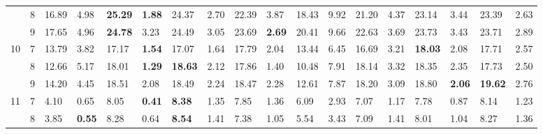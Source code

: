 \documentclass[conference]{IEEEtran}
\begin{document}
\begin{table*}[]
\begin{tabular}{|cl|ll|ll|ll|ll|ll|ll|ll|ll|}
		\multicolumn{1}{|c|}{} & 8 & \multicolumn{1}{l|}{16.89} & 4.98 & \multicolumn{1}{l|}{\textbf{25.29}} & \textbf{1.88} & \multicolumn{1}{l|}{24.37} & 2.70 & \multicolumn{1}{l|}{22.39} & 3.87 & \multicolumn{1}{l|}{18.43} & 9.92 & \multicolumn{1}{l|}{21.20} & 4.37 & \multicolumn{1}{l|}{23.14} & 3.44 & \multicolumn{1}{l|}{23.39} & 2.63 \\ \cline{2-18} 
		\multicolumn{1}{|c|}{} & 9 & \multicolumn{1}{l|}{17.65} & 4.96 & \multicolumn{1}{l|}{\textbf{24.78}} & 3.23 & \multicolumn{1}{l|}{24.49} & 3.05 & \multicolumn{1}{l|}{23.69} & \textbf{2.69} & \multicolumn{1}{l|}{20.41} & 9.66 & \multicolumn{1}{l|}{22.63} & 3.69 & \multicolumn{1}{l|}{23.73} & 3.43 & \multicolumn{1}{l|}{23.71} & 2.89 \\ \hline
		\multicolumn{1}{|c|}{\multirow{3}{*}{10}} & 7 & \multicolumn{1}{l|}{13.79} & 3.82 & \multicolumn{1}{l|}{17.17} & \textbf{1.54} & \multicolumn{1}{l|}{17.07} & 1.64 & \multicolumn{1}{l|}{17.79} & 2.04 & \multicolumn{1}{l|}{13.44} & 6.45 & \multicolumn{1}{l|}{16.69} & 3.21 & \multicolumn{1}{l|}{\textbf{18.03}} & 2.08 & \multicolumn{1}{l|}{17.71} & 2.57 \\ \cline{2-18} 
		\multicolumn{1}{|c|}{} & 8 & \multicolumn{1}{l|}{12.66} & 5.17 & \multicolumn{1}{l|}{18.01} & \textbf{1.29} & \multicolumn{1}{l|}{\textbf{18.63}} & 2.12 & \multicolumn{1}{l|}{17.86} & 1.40 & \multicolumn{1}{l|}{10.48} & 7.91 & \multicolumn{1}{l|}{18.14} & 3.32 & \multicolumn{1}{l|}{18.35} & 2.35 & \multicolumn{1}{l|}{17.73} & 2.50 \\ \cline{2-18} 
		\multicolumn{1}{|c|}{} & 9 & \multicolumn{1}{l|}{14.20} & 4.45 & \multicolumn{1}{l|}{18.51} & 2.08 & \multicolumn{1}{l|}{18.49} & 2.24 & \multicolumn{1}{l|}{18.47} & 2.28 & \multicolumn{1}{l|}{12.61} & 7.87 & \multicolumn{1}{l|}{18.20} & 3.09 & \multicolumn{1}{l|}{18.80} & \textbf{2.06} & \multicolumn{1}{l|}{\textbf{19.62}} & 2.76 \\ \hline
		\multicolumn{1}{|c|}{\multirow{3}{*}{11}} & 7 & \multicolumn{1}{l|}{4.10} & 0.65 & \multicolumn{1}{l|}{8.05} & \textbf{0.41} & \multicolumn{1}{l|}{\textbf{8.38}} & 1.35 & \multicolumn{1}{l|}{7.85} & 1.36 & \multicolumn{1}{l|}{6.09} & 2.93 & \multicolumn{1}{l|}{7.07} & 1.17 & \multicolumn{1}{l|}{7.78} & 0.87 & \multicolumn{1}{l|}{8.14} & 1.23 \\ \cline{2-18} 
		\multicolumn{1}{|c|}{} & 8 & \multicolumn{1}{l|}{3.85} & \textbf{0.55} & \multicolumn{1}{l|}{8.28} & 0.64 & \multicolumn{1}{l|}{\textbf{8.54}} & 1.41 & \multicolumn{1}{l|}{7.38} & 1.05 & \multicolumn{1}{l|}{5.54} & 3.43 & \multicolumn{1}{l|}{7.09} & 1.41 & \multicolumn{1}{l|}{8.01} & 1.04 & \multicolumn{1}{l|}{8.27} & 1.36 \\ \cline{2-18} 

\end{tabular}
\end{table*}
\end{document}
